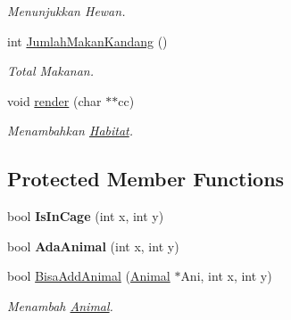 \begin{DoxyCompactItemize}
\begin{DoxyCompactList}\small\item\em Menunjukkan Hewan. \end{DoxyCompactList}\item 
int \hyperlink{class_cage_a4aaadecb8628c82e3611cc3bf99df9b3}{Jumlah\+Makan\+Kandang} ()
\begin{DoxyCompactList}\small\item\em Total Makanan. \end{DoxyCompactList}\item 
void \hyperlink{class_cage_aabfee407ec4cff7ef83e122611244a07}{render} (char $\ast$$\ast$cc)
\begin{DoxyCompactList}\small\item\em Menambahkan \hyperlink{class_habitat}{Habitat}. \end{DoxyCompactList}\end{DoxyCompactItemize}
\subsection*{Protected Member Functions}
\begin{DoxyCompactItemize}
\item 
bool {\bfseries Is\+In\+Cage} (int x, int y)\hypertarget{class_cage_a72145e1ca4fc9716d09ba1bcf3ae6bf3}{}\label{class_cage_a72145e1ca4fc9716d09ba1bcf3ae6bf3}

\item 
bool {\bfseries Ada\+Animal} (int x, int y)\hypertarget{class_cage_a13297d663f6a114deeb56306756e8aa5}{}\label{class_cage_a13297d663f6a114deeb56306756e8aa5}

\item 
bool \hyperlink{class_cage_a53c42a46fc76605447aa08b7c51855c8}{Bisa\+Add\+Animal} (\hyperlink{class_animal}{Animal} $\ast$Ani, int x, int y)
\begin{DoxyCompactList}\small\item\em Menambah \hyperlink{class_animal}{Animal}. \end{DoxyCompactList}\end{DoxyCompactItemize}
